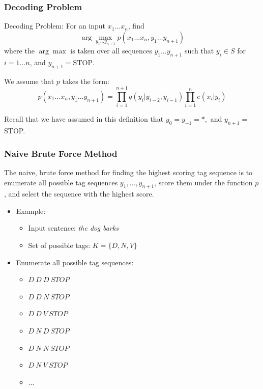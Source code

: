 \documentclass[handout]{beamer}
\begin{document}
\begin{frame}
  \frametitle{Decoding Problem}
  Decoding Problem: For an input $x_1 \ldots x_n$, find
  \[
    \arg \max_{y_1 \ldots y_{n+1}} p(x_1 \ldots x_n, y_1 \ldots y_{n+1})
  \]
  where the $\arg \max$ is taken over all sequences $y_1 \ldots y_{n+1}$ such that $y_i \in S$ for $i = 1 \ldots n$, and $y_{n+1} = \text{STOP}$.

  We assume that $p$ takes the form:
  \[
    p(x_1 \ldots x_n, y_1 \ldots y_{n+1}) = \prod_{i=1}^{n+1} q(y_i|y_{i-2}, y_{i-1}) \prod_{i=1}^{n} e(x_i|y_i)
  \]
  
  
  Recall that we have assumed in this definition that $y_0 = y_{-1} = *,$ and $y_{n+1} =$ STOP.
  
\end{frame}


\begin{frame}
\frametitle{Naive Brute Force Method}
\scriptsize

The naive, brute force method for finding the highest scoring tag sequence is to enumerate all possible tag sequences $y_1, \ldots, y_{n+1}$, score them under the function $p$, and select the sequence with the highest score.

\begin{itemize}
    \item Example:
    \begin{itemize}
        \item Input sentence: \textit{the dog barks}
        \item Set of possible tags: $K = \{D, N, V\}$
    \end{itemize}
    
    \item Enumerate all possible tag sequences:
    \begin{itemize}
        \item $D\ D\ D\ STOP$
        \item $D\ D\ N\ STOP$
        \item $D\ D\ V\ STOP$
        \item $D\ N\ D\ STOP$
        \item $D\ N\ N\ STOP$
        \item $D\ N\ V\ STOP$
        \item ...
    \end{itemize}
   
\end{itemize}

\end{frame}
\end{document}

